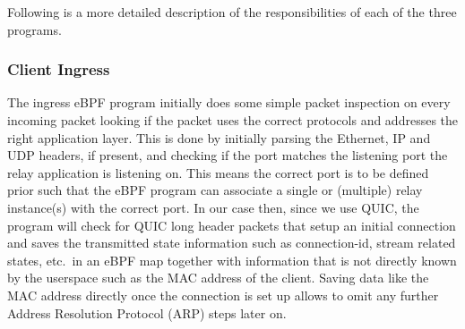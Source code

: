 Following is a more detailed description of the responsibilities of each of the three programs.
\subsubsection{Client Ingress} 
The ingress eBPF program initially does some simple packet inspection on every incoming packet 
looking if the packet uses the correct protocols and addresses the right application layer.
This is done by initially parsing the Ethernet, IP and UDP headers, if present, and checking if 
the port matches the listening port the relay application is listening on.
This means the correct port is to be defined prior such that the eBPF program can associate 
a single or (multiple) relay instance(s) with the correct port.
In our case then, since we use QUIC, the program will check for QUIC long header packets that 
setup an initial connection and saves the transmitted state information such as connection-id, 
stream related states, etc.~in an eBPF map together with information that is not directly known
by the userspace such as the MAC address of the client.
Saving data like the MAC address directly once the connection is set up allows to omit any further 
Address Resolution Protocol (ARP) steps later on. 

